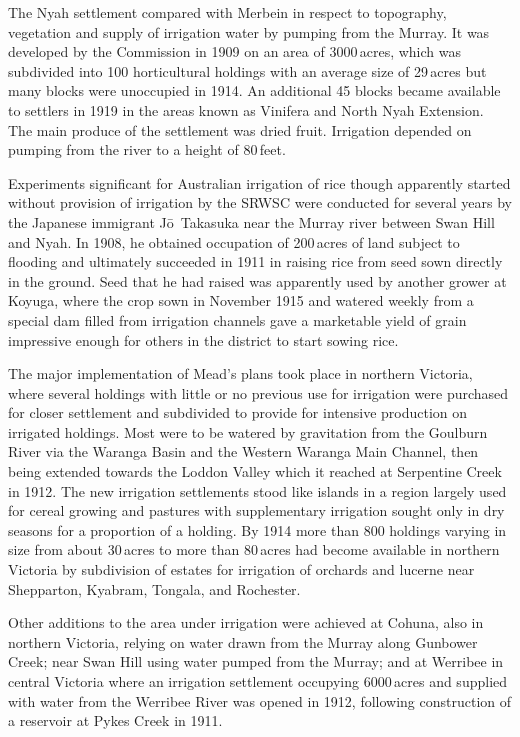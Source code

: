 The Nyah settlement compared with Merbein in respect to topography,
vegetation and supply of irrigation water by pumping from the Murray.
It was developed by the Commission in 1909 on an area of 3000\,acres,
which was subdivided into 100 horticultural holdings with an average
size of 29\,acres but many blocks were unoccupied in 1914. An
additional 45 blocks became available to settlers in 1919 in the areas
known as Vinifera and North Nyah Extension.  The main produce of the
settlement was dried fruit.  Irrigation depended on pumping from the
river to a height of 80\,feet.

Experiments significant for Australian irrigation of rice though
apparently started without provision of irrigation by the SRWSC were
conducted for several years by the Japanese immigrant
J{\={o}}~Takasuka near the Murray river between Swan Hill and Nyah.
In 1908, he obtained occupation of 200\,acres of land subject to flooding
and ultimately succeeded in 1911 in raising rice from seed sown
directly in the ground.  Seed that he had raised was apparently used
by another grower at Koyuga, where the crop sown in November 1915 and
watered weekly from a special dam filled from irrigation channels gave
a marketable yield of grain impressive enough for others in the
district to start sowing rice.

The major implementation of Mead's plans took place in northern
Victoria, where several holdings with little or no previous use for
irrigation were purchased for closer settlement and subdivided to
provide for intensive production on irrigated holdings.  Most were to
be watered by gravitation from the Goulburn River via the Waranga
Basin and the Western Waranga Main Channel, then being extended
towards the Loddon Valley which it reached at Serpentine Creek in
1912.  The new irrigation settlements stood like islands in a region
largely used for cereal growing and pastures with supplementary
irrigation sought only in dry seasons for a proportion of a holding.
By 1914 more than 800 holdings varying in size from about 30\,acres to
more than 80\,acres had become available in northern Victoria by
subdivision of estates for irrigation of orchards and lucerne near
Shepparton, Kyabram, Tongala, and
Rochester.

Other additions to the area under irrigation were achieved at Cohuna,
also in northern Victoria, relying on water drawn from the Murray
along Gunbower Creek; near Swan Hill using water pumped from the
Murray; and at Werribee in central Victoria where an irrigation
settlement occupying 6000\,acres and supplied with water from the
Werribee River was opened in 1912, following construction of a
reservoir at Pykes Creek in 1911.

